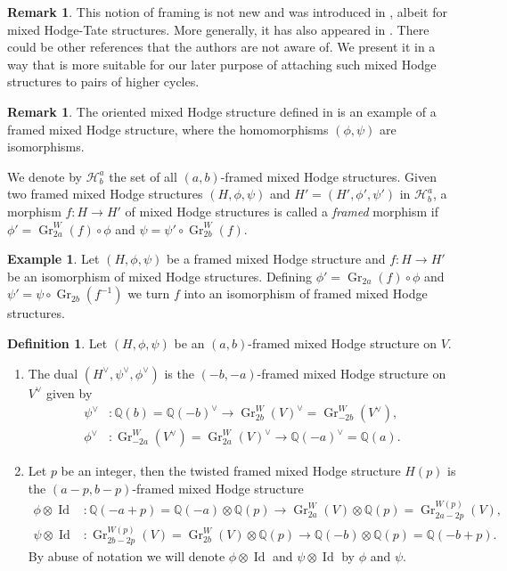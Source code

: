 \documentclass[11pt,a4paper]{amsart}
\newcommand{\Q}{\mathds{Q}}
\newcommand{\caH}{\mathcal{H}}
\DeclareMathOperator {\Gr} {Gr}
\DeclareMathOperator{\Id}{Id}
\numberwithin{equation}{section}
\theoremstyle{plain}
\theoremstyle{definition}
\newtheorem{df}[prop]{Definition}
\newtheorem{rmk}[prop]{Remark}
\newtheorem{ex}[prop]{Example}
\begin{document}
\begin{rmk}
This notion of framing is not new and was introduced in \cite[\S 1.3.4]{BGSV}, albeit for mixed Hodge-Tate structures. More generally, it has also appeared in \cite{AJ03}. There could be other references that the authors are not aware of. We present it in a way that is more suitable for our later purpose of attaching such mixed Hodge structures to pairs of higher cycles.
\end{rmk}

\begin{rmk}
The oriented mixed Hodge structure defined in \cite[Definition 2.3]{BGGP:Height} is an example of a framed mixed Hodge structure,
where the homomorphisms $(\phi,\psi)$ are isomorphisms.
\end{rmk}

We denote by $\caH^{a}_{b}$ the set of all $(a,b)$-framed mixed
Hodge structures. Given two framed mixed Hodge
structures $(H, \phi,\psi)$ and $H'=(H',\phi', \psi')$ in
$\caH^{a}_{b}$, a morphism $f\colon H\to H'$ of 
mixed Hodge structures is called a \textit{framed} morphism if
$\phi'=\Gr_{2a}^{W}(f)\circ \phi$ and
$\psi=\psi'\circ \Gr_{2b}^{W}(f)$.
\begin{ex}
  Let $(H,\phi ,\psi )$ be a framed mixed Hodge structure and $f\colon
  H\to H'$ be an isomorphism of mixed Hodge structures. Defining
  $\phi'=\Gr_{2a}(f) \circ \phi $ and $\psi '=\psi \circ
  \Gr_{2b}(f^{-1})$ we turn $f$ into an isomorphism of framed mixed
  Hodge structures. 
\end{ex}


\begin{df}\label{rmk-dual-frm}
Let $(H,\phi ,\psi )$ be an $(a,b)$-framed mixed Hodge structure on $V$.
\begin{enumerate}
\item The  dual $(H^{\vee},\psi ^{\vee},\phi ^{\vee})$ is the $(-b,-a)$-framed mixed Hodge
  structure on $V^{\vee}$ given by
  \begin{align*}
    \psi^{\vee}&\colon \Q(b)=\Q(-b)^{\vee}
    \to \Gr^{W}_{2b}(V)^{\vee}= \Gr^{W}_{-2b}(V^{\vee}),\\
    \phi^{\vee}&\colon
    \Gr^{W}_{-2a}(V^{\vee})=\Gr^{W}_{2a}(V)^{\vee}\to \Q(-a)^{\vee}=\Q(a).
  \end{align*}
\item Let $p$ be an integer, then the twisted framed mixed Hodge
  structure  $H(p)$ is the $(a-p,b-p)$-framed mixed Hodge structure
  \begin{align*}
    \phi \otimes \Id&\colon \Q(-a+p) =\Q(-a)\otimes
    \Q(p)\longrightarrow \Gr^{W}_{2a}(V)\otimes
    \Q(p)= \Gr^{W(p)}_{2a-2p}(V),\\
    \psi\otimes \Id &\colon \Gr^{W(p)}_{2b-2p}(V)=
    \Gr^{W}_{2b}(V)\otimes \Q(p)
         \longrightarrow \Q(-b)\otimes
    \Q(p)=\Q(-b+p).
\end{align*}
By abuse of notation we will denote $\phi \otimes \Id$ and
$\psi\otimes \Id$ by $\phi $ and $\psi $.
\end{enumerate}
\end{df}
\end{document}

